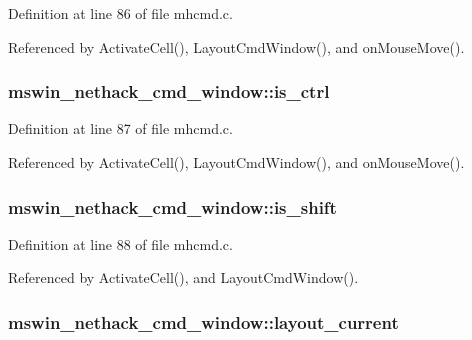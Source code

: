Definition at line 86 of file mhcmd.\+c.



Referenced by Activate\+Cell(), Layout\+Cmd\+Window(), and on\+Mouse\+Move().

\hypertarget{structmswin__nethack__cmd__window_aff2fb0876c6837b751726f8eea0c418f}{
\subsubsection[{is\+\_\+ctrl}]{ mswin\+\_\+nethack\+\_\+cmd\+\_\+window\+::is\+\_\+ctrl}}\label{structmswin__nethack__cmd__window_aff2fb0876c6837b751726f8eea0c418f}


Definition at line 87 of file mhcmd.\+c.



Referenced by Activate\+Cell(), Layout\+Cmd\+Window(), and on\+Mouse\+Move().

\hypertarget{structmswin__nethack__cmd__window_ad6fd9ac96bc191d831bbb6e73385af1e}{
\subsubsection[{is\+\_\+shift}]{ mswin\+\_\+nethack\+\_\+cmd\+\_\+window\+::is\+\_\+shift}}\label{structmswin__nethack__cmd__window_ad6fd9ac96bc191d831bbb6e73385af1e}


Definition at line 88 of file mhcmd.\+c.



Referenced by Activate\+Cell(), and Layout\+Cmd\+Window().

\hypertarget{structmswin__nethack__cmd__window_a831bb0bd75e68f9481f2ee8b7c13bdf5}{
\subsubsection[{layout\+\_\+current}]{ mswin\+\_\+nethack\+\_\+cmd\+\_\+window\+::layout\+\_\+current}}\label{structmswin__nethack__cmd__window_a831bb0bd75e68f9481f2ee8b7c13bdf5}


